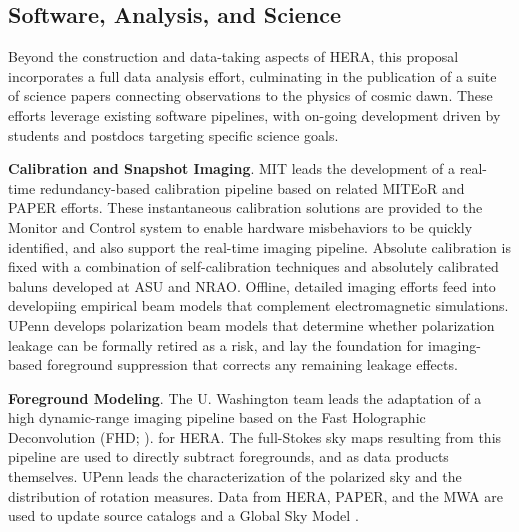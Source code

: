 \documentclass[preprint]{aastex}
\newcommand{\compress}{\vspace{-0.3in}}
\begin{document}
\compress
\subsection{Software, Analysis, and Science}
\label{sec:analysis}

Beyond the construction and data-taking aspects of HERA, this proposal
incorporates a full data analysis effort, culminating in the publication of a
suite of science papers connecting observations to the physics of cosmic dawn.
These efforts leverage existing software pipelines, with on-going 
development driven by students and postdocs targeting specific science goals.  

\label{sec:calibration} %

{\bf Calibration and Snapshot Imaging}. MIT leads
the development of a real-time redundancy-based calibration pipeline based on related
MITEoR and PAPER efforts.
These instantaneous calibration solutions are provided to
the Monitor and Control system to enable 
hardware misbehaviors to be quickly identified, and also support the
real-time imaging pipeline.  Absolute calibration is fixed with
a combination of self-calibration techniques and absolutely calibrated baluns developed at ASU and NRAO.
Offline, detailed imaging efforts feed into developiing
empirical beam models that
complement electromagnetic simulations.  UPenn develops polarization beam models
that determine whether polarization leakage can be formally retired as 
a risk, and lay the foundation for imaging-based foreground suppression that
corrects any remaining leakage effects.

\label{sec:DataProducts} %

{\bf Foreground Modeling}. The U. Washington team leads the adaptation
of a high dynamic-range imaging pipeline
based on the Fast Holographic Deconvolution (FHD; \citealt{sullivan_et_al2012}).
for HERA.  The full-Stokes sky maps resulting from this pipeline
are used to directly subtract foregrounds,
and as data products themselves.  UPenn leads
the characterization of the polarized sky and the
distribution of rotation measures.  Data from HERA, PAPER, and the MWA are used
to update source catalogs and a Global
Sky Model \citep{deoliveira2008}. %
\end{document}
